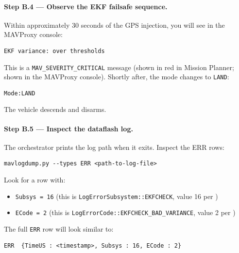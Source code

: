 \documentclass[a4paper,11pt,twoside]{article}
\begin{document}
\paragraph{Step B.4 --- Observe the EKF failsafe sequence.}
Within approximately 30 seconds of the GPS injection, you will see in the MAVProxy console:

\begin{Verbatim}[frame=single,fontsize=\small]
EKF variance: over thresholds
\end{Verbatim}

This is a \texttt{MAV\_SEVERITY\_CRITICAL} message (shown in red in Mission Planner; shown in the MAVProxy console). Shortly after, the mode changes to \texttt{LAND}:

\begin{Verbatim}[frame=single,fontsize=\small]
Mode:LAND
\end{Verbatim}

The vehicle descends and disarms.

\paragraph{Step B.5 --- Inspect the dataflash log.}
The orchestrator prints the log path when it exits. Inspect the ERR rows:

\begin{Verbatim}[frame=single,fontsize=\small]
mavlogdump.py --types ERR <path-to-log-file>
\end{Verbatim}

Look for a row with:
\begin{itemize}
  \item \texttt{Subsys = 16} (this is \texttt{LogErrorSubsystem::EKFCHECK}, value 16 per )
  \item \texttt{ECode = 2} (this is \texttt{LogErrorCode::EKFCHECK\_BAD\_VARIANCE}, value 2 per )
\end{itemize}

The full \texttt{ERR} row will look similar to:

\begin{Verbatim}[frame=single,fontsize=\small]
ERR  {TimeUS : <timestamp>, Subsys : 16, ECode : 2}
\end{Verbatim}
\end{document}

